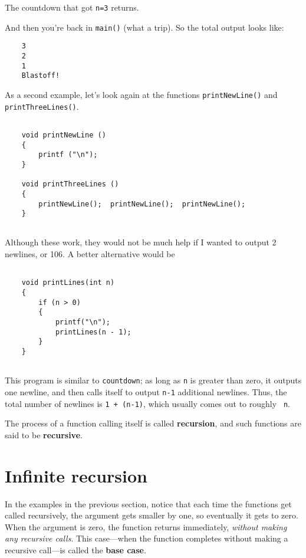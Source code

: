 The countdown that got {\tt n=3} returns.

\noindent And then you're back in {\tt main()} (what a trip).  So the
total output looks like:

\begin{verbatim}
    3
    2
    1
    Blastoff!
\end{verbatim}
%
As a second example, let's look again at the functions
{\tt printNewLine()} and {\tt printThreeLines()}.

\begin{verbatim}

    void printNewLine () 
    {
        printf ("\n");
    }

    void printThreeLines () 
    {
        printNewLine();  printNewLine();  printNewLine();
    }
    
\end{verbatim}
%
Although these work, they would not be much help if I wanted
to output 2 newlines, or 106.  A better alternative would be

\begin{verbatim}

    void printLines(int n) 
    {
        if (n > 0) 
        {
            printf("\n");
            printLines(n - 1);
        }
    }
    
\end{verbatim}
%
This program is similar to {\tt countdown}; as long as {\tt n} is
greater than zero, it outputs one newline, and then calls itself to
output {\tt n-1} additional newlines.  Thus, the total number of
newlines is {\tt 1 + (n-1)}, which usually comes out to roughly {\tt
n}.


The process of a function calling itself is called {\bf recursion}, and
such functions are said to be {\bf recursive}.

\section {Infinite recursion}

In the examples in the previous section, notice that each time the
functions get called recursively, the argument gets smaller by one, so
eventually it gets to zero.  When the argument is zero, the function
returns immediately, {\em without making any recursive calls}.
This case---when the function completes without making a recursive
call---is called the {\bf base case}.

